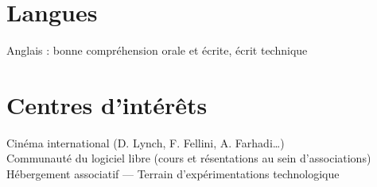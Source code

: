 \documentclass[a4paper]{tsacha-resume}
\begin{document}
\begin{minipage}[t]{0.67\textwidth}
  \section{Langues}
  Anglais : bonne compréhension orale et écrite, écrit technique

  \section{Centres d'intérêts}
  Cinéma international (D. Lynch, F. Fellini, A. Farhadi…) \\
  Communauté du logiciel libre (cours et résentations au sein d'associations) \\
  Hébergement associatif — Terrain d'expérimentations technologique

\end{minipage}
\end{document}
